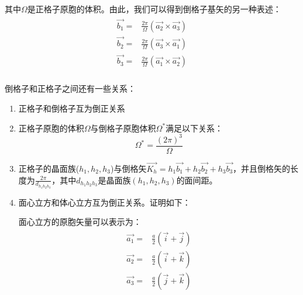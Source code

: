 \documentclass{ctexart}
\begin{document}
        其中$\Omega$是正格子原胞的体积。由此，我们可以得到倒格子基矢的另一种表述：
        \begin{align}
            \begin{split}
                \vec{b_1}=&\frac{2\pi}{\Omega}(\vec{a_2}\times\vec{a_3})\\
                \vec{b_2}=&\frac{2\pi}{\Omega}(\vec{a_3}\times\vec{a_1})\\
                \vec{b_3}=&\frac{2\pi}{\Omega}(\vec{a_1}\times\vec{a_2})\\
            \end{split}
        \end{align}
        
        倒格子和正格子之间还有一些关系：
        \begin{enumerate}
            \item 正格子和倒格子互为倒正关系
            \item 正格子原胞的体积$\Omega$与倒格子原胞体积$\Omega^*$满足以下关系：
                \begin{equation}
                    \Omega^*=\frac{(2\pi)^3}{\Omega}
                \end{equation}
            \item 正格子的晶面族($h_1,h_2,h_3$)与倒格矢$\vec{K_h}=h_1\vec{b_1}+h_2\vec{b_2}+h_3\vec{b_3}$，并且倒格矢的长度为$\frac{2\pi}{d_{h_1h_2h_3}}$，其中$d_{h_1h_2h_3}$是晶面族$(h_1,h_2,h_3)$的面间距。
            \item 面心立方和体心立方互为倒正关系。证明如下：
            
            面心立方的原胞矢量可以表示为：
            \begin{align}
                \begin{split}
                    \vec{a_1}=&\frac{a}{2}(\vec{i}+\vec{j})\\
                    \vec{a_2}=&\frac{a}{2}(\vec{i}+\vec{k})\\
                    \vec{a_3}=&\frac{a}{2}(\vec{j}+\vec{k})
                \end{split}
            \end{align}
            

\end{enumerate}
\end{document}
